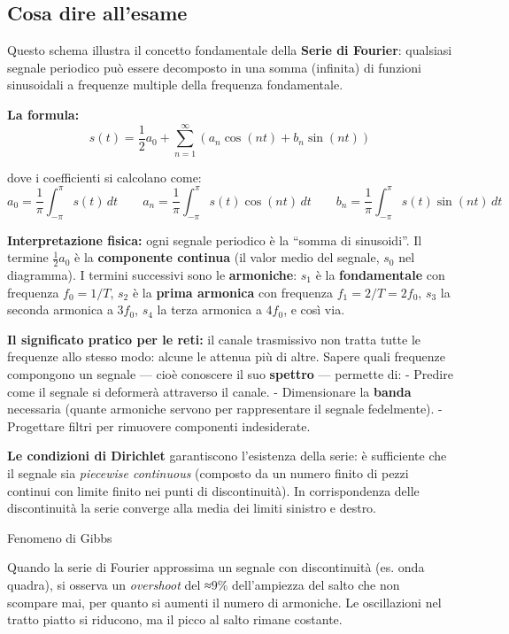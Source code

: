 \documentclass[
  italian,
  openany]{book}
\begin{document}
\subsection{Cosa dire all'esame}\label{cosa-dire-allesame-14}

Questo schema illustra il concetto fondamentale della \textbf{Serie di
Fourier}: qualsiasi segnale periodico può essere decomposto in una somma
(infinita) di funzioni sinusoidali a frequenze multiple della frequenza
fondamentale.

\textbf{La formula:}
\[s(t) = \frac{1}{2}a_0 + \sum_{n=1}^{\infty}\left(a_n \cos(nt) + b_n \sin(nt)\right)\]

dove i coefficienti si calcolano come:
\[a_0 = \frac{1}{\pi}\int_{-\pi}^{\pi} s(t)\,dt \qquad a_n = \frac{1}{\pi}\int_{-\pi}^{\pi} s(t)\cos(nt)\,dt \qquad b_n = \frac{1}{\pi}\int_{-\pi}^{\pi} s(t)\sin(nt)\,dt\]

\textbf{Interpretazione fisica:} ogni segnale periodico è la ``somma di
sinusoidi''. Il termine \(\frac{1}{2}a_0\) è la \textbf{componente
continua} (il valor medio del segnale, \(s_0\) nel diagramma). I termini
successivi sono le \textbf{armoniche}: \(s_1\) è la
\textbf{fondamentale} con frequenza \(f_0 = 1/T\), \(s_2\) è la
\textbf{prima armonica} con frequenza \(f_1 = 2/T = 2f_0\), \(s_3\) la
seconda armonica a \(3f_0\), \(s_4\) la terza armonica a \(4f_0\), e
così via.

\textbf{Il significato pratico per le reti:} il canale trasmissivo non
tratta tutte le frequenze allo stesso modo: alcune le attenua più di
altre. Sapere quali frequenze compongono un segnale --- cioè conoscere
il suo \textbf{spettro} --- permette di: - Predire come il segnale si
deformerà attraverso il canale. - Dimensionare la \textbf{banda}
necessaria (quante armoniche servono per rappresentare il segnale
fedelmente). - Progettare filtri per rimuovere componenti indesiderate.

\textbf{Le condizioni di Dirichlet} garantiscono l'esistenza della
serie: è sufficiente che il segnale sia \emph{piecewise continuous}
(composto da un numero finito di pezzi continui con limite finito nei
punti di discontinuità). In corrispondenza delle discontinuità la serie
converge alla media dei limiti sinistro e destro.

\begin{calloutwarning}{Fenomeno di Gibbs}

Quando la serie di Fourier approssima un segnale con discontinuità (es.
onda quadra), si osserva un \emph{overshoot} del ≈9\% dell'ampiezza del
salto che non scompare mai, per quanto si aumenti il numero di
armoniche. Le oscillazioni nel tratto piatto si riducono, ma il picco al
salto rimane costante.

\end{calloutwarning}
\end{document}
